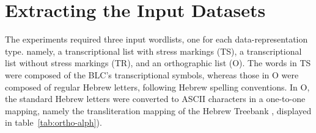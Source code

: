 \section{Extracting the Input Datasets}
\label{sec:extr}
The experiments required three input wordlists, one for each data-representation type. 
namely, a transcriptional list with stress markings (TS), a transcriptional list without stress markings  (TR), and an orthographic list (O).
The words in TS were composed of the \ac{BLC}'s transcriptional symbols, 
whereas those in O
were composed of regular Hebrew letters, following Hebrew spelling conventions. 
In O, the standard Hebrew letters were converted to ASCII characters in a one-to-one
mapping, namely the transliteration mapping of the Hebrew Treebank 
\citep{simaan-et-al:2001}, displayed in table~\ref{tab:ortho-alph}). %
